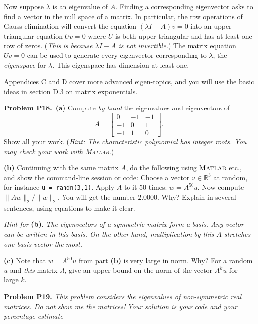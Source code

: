 \documentclass[12pt]{amsart}
\newcommand{\RR}{\mathbb{R}}
\newcommand{\Matlab}{\textsc{Matlab}\xspace}
\newcommand{\prob}[1]{\bigskip\noindent\textbf{#1}\quad }
\newcommand{\epart}[1]{\medskip\noindent\textbf{(#1)}\quad }
\newcommand{\ppart}[1]{\,\textbf{(#1)}\quad }
\begin{document}
Now suppose $\lambda$ is an eigenvalue of $A$.  Finding a corresponding eigenvector asks to find a vector in the null space of a matrix.  In particular, the row operations of Gauss elimination will convert the equation $(\lambda I - A) v = 0$ into an upper triangular equation $U v = 0$ where $U$ is both upper triangular and has at least one row of zeros.  (\emph{This is because $\lambda I - A$ is not invertible.})  The matrix equation $U v = 0$ can be used to generate every eigenvector corresponding to $\lambda$, the \emph{eigenspace} for $\lambda$.  This eigenspace has dimension at least one.

Appendices C and D cover more advanced eigen-topics, and you will use the basic ideas in section D.3 on matrix exponentials.

\noindent \hrulefill
\clearpage \newpage


\prob{Problem P18.}  \ppart{a}  Compute \emph{by hand} the eigenvalues and eigenvectors of
    $$A = \begin{bmatrix} 0 & -1 & -1 \\
                         -1 & 0  & 1 \\
                         -1 & 1  & 0  \end{bmatrix}.$$
Show all your work.  (\emph{Hint: The characteristic polynomial has integer roots.  You may \emph{check} your work with \Matlab.})

\epart{b}  Continuing with the same matrix $A$, do the following using $\Matlab$ etc., and show the command-line session or code:  Choose a vector $u\in\RR^3$ at random, for instance \texttt{u = randn(3,1)}.  Apply $A$ to it 50 times: $w = A^{50} u$.  Now compute $\|A w\|_2/\|w\|_2$.  You will get the number $2.0000$.  Why?  Explain in several sentences, using equations to make it clear.

\medskip
\noindent \emph{Hint for} \textbf{(b)}.  \emph{The eigenvectors of a symmetric matrix form a basis.  Any vector can be written in this basis.  On the other hand, multiplication by \emph{this} $A$ stretches one basis vector the most.}

\epart{c}  Note that $w = A^{50} u$ from part \textbf{(b)} is very large in norm.  Why?  For a random $u$ and \emph{this} matrix $A$, give an upper bound on the norm of the vector $A^k u$ for large $k$.


\prob{Problem P19.}  \emph{This problem considers the eigenvalues of \emph{non-symmetric} real matrices.  Do not show me the matrices!  Your solution is your code and your percentage estimate.}
\end{document}
